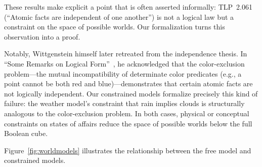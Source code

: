 \documentclass[10pt, letterpaper]{article}
\theoremstyle{definition}
\theoremstyle{remark}
\begin{document}
\noindent
These results make explicit a point that is often asserted
informally: TLP~2.061 (``Atomic facts are independent of one
another'') is not a logical law but a constraint on the space of
possible worlds.  Our formalization turns this observation into a
proof.

Notably, Wittgenstein himself later retreated from the
independence thesis.  In ``Some Remarks on Logical
Form''~\cite{wittgenstein1929}, he acknowledged that the
color-exclusion problem---the mutual incompatibility of
determinate color predicates (e.g., a point cannot be both red
and blue)---demonstrates that certain atomic facts are not
logically independent.  Our constrained models formalize
precisely this kind of failure: the weather model's constraint
that rain implies clouds is structurally analogous to the
color-exclusion problem.  In both cases, physical or conceptual
constraints on states of affairs reduce the space of possible
worlds below the full Boolean cube.

Figure~\ref{fig:worldmodels} illustrates the relationship
between the free model and constrained models.
\end{document}
